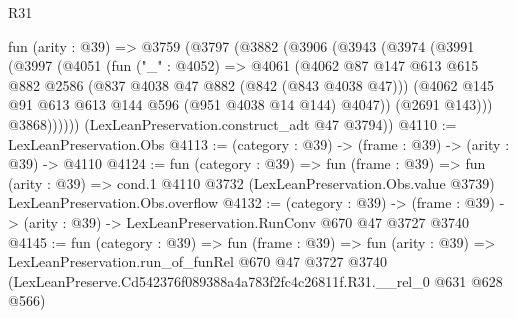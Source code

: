 \begin{lexlean}{R31}
\begin{coremodule}
  fun (arity : @39) =>
  @3759
    (@3797
      (@3882
        (@3906
          (@3943
            (@3974
              (@3991
                (@3997
                  (@4051
                    (fun ("_" : @4052) =>
                    @4061
                      (@4062
                        @87
                        @147
                        @613
                        @615
                        @882
                        @2586
                        (@837 @4038 @47 @882 (@842 (@843 @4038 @47)))
                        (@4062 @145 @91 @613 @613 @144 @596 (@951 @4038 @14 @144) @4047))
                      (@2691 @143)))
                  @3868))))))
      (LexLeanPreservation.construct_adt @47 @3794))
@4110 := LexLeanPreservation.Obs
@4113 := (category : @39) -> (frame : @39) -> (arity : @39) -> @4110
@4124 := fun (category : @39) =>
  fun (frame : @39) =>
  fun (arity : @39) =>
  cond.{1} @4110 @3732 (LexLeanPreservation.Obs.value @3739) LexLeanPreservation.Obs.overflow
@4132 := (category : @39) ->
  (frame : @39) -> (arity : @39) -> LexLeanPreservation.RunConv @670 @47 @3727 @3740
@4145 := fun (category : @39) =>
  fun (frame : @39) =>
  fun (arity : @39) =>
  LexLeanPreservation.run_of_funRel
    @670
    @47
    @3727
    @3740
    (LexLeanPreserve.Cd542376f089388a4a783f2fc4c26811f.R31.__rel_0 @631 @628 @566)
\end{coremodule}
\end{lexlean}
